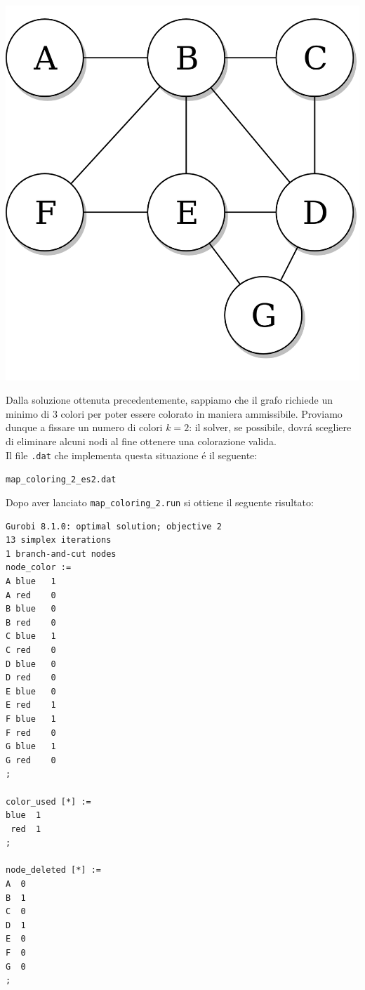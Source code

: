 \documentclass{article}
\begin{document}
\begin{center}
\includegraphics[scale=0.15]{non_complete_graph.png}
\end{center}

Dalla soluzione ottenuta precedentemente, sappiamo che il grafo richiede un minimo di 3 colori per poter essere colorato in maniera ammissibile. Proviamo dunque a fissare un numero di colori $k = 2$: il solver, se possibile, dovr\'a scegliere di eliminare alcuni nodi al fine ottenere una colorazione valida.\\

Il file \texttt{.dat} che implementa questa situazione \'e il seguente:

\vspace{5mm}
\texttt{map\_coloring\_2\_es2.dat}

\vspace{5mm}

\pagebreak

Dopo aver lanciato \texttt{map\_coloring\_2.run} si ottiene il seguente risultato:\\

\begin{verbatim}
Gurobi 8.1.0: optimal solution; objective 2
13 simplex iterations
1 branch-and-cut nodes
node_color :=
A blue   1
A red    0
B blue   0
B red    0
C blue   1
C red    0
D blue   0
D red    0
E blue   0
E red    1
F blue   1
F red    0
G blue   1
G red    0
;

color_used [*] :=
blue  1
 red  1
;

node_deleted [*] :=
A  0
B  1
C  0
D  1
E  0
F  0
G  0
;

\end{verbatim}
\end{document}
